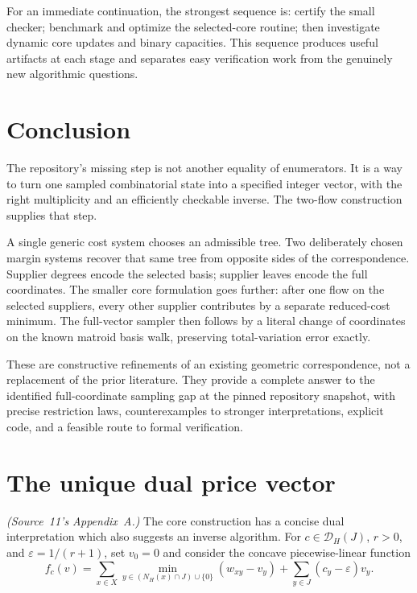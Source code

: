 \documentclass[11pt]{article}
\numberwithin{equation}{section}
\theoremstyle{definition}
\newcommand{\cD}{\mathcal D}
\begin{document}
For an immediate continuation, the strongest sequence is: certify the
small checker; benchmark and optimize the selected-core routine; then
investigate dynamic core updates and binary capacities. This sequence
produces useful artifacts at each stage and separates easy verification
work from the genuinely new algorithmic questions.

\section{Conclusion}
The repository's missing step is not another equality of enumerators.
It is a way to turn one sampled combinatorial state into a specified
integer vector, with the right multiplicity and an efficiently checkable
inverse. The two-flow construction supplies that step.

A single generic cost system chooses an admissible tree. Two deliberately
chosen margin systems recover that same tree from opposite sides of the
correspondence. Supplier degrees encode the selected basis; supplier
leaves encode the full coordinates. The smaller core formulation goes
further: after one flow on the selected suppliers, every other supplier
contributes by a separate reduced-cost minimum. The full-vector sampler
then follows by a literal change of coordinates on the known matroid
basis walk, preserving total-variation error exactly.

These are constructive refinements of an existing geometric
correspondence, not a replacement of the prior literature. They provide a
complete answer to the identified full-coordinate sampling gap at the
pinned repository snapshot, with precise restriction laws, counterexamples
to stronger interpretations, explicit code, and a feasible route to
formal verification.

\section{The unique dual price vector}
\label{tf:app:prices}
\noindent\emph{(Source~11's Appendix~A.)}
The core construction has a concise dual interpretation which also
suggests an inverse algorithm. For $c\in\cD_H(J)$, $r>0$, and
$\varepsilon=1/(r+1)$, set $v_0=0$ and consider the concave piecewise-linear
function
\begin{equation}
 f_c(v)=\sum_{x\in X}\min_{y\in (N_H(x)\cap J)\cup\{0\}}
                         (w_{xy}-v_y)
              +\sum_{y\in J}(c_y-\varepsilon)v_y.
 \label{tf:eq:priceobjective}
\end{equation}
\end{document}
